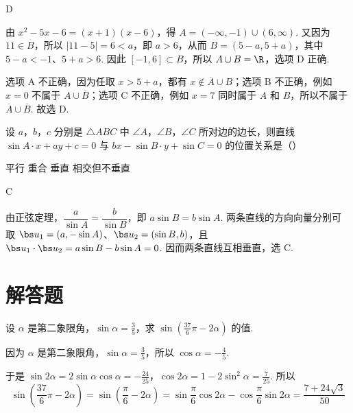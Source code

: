 \documentclass[UTF8,a4paper,oneside,11pt]{ctexbook}
\begin{document}
\begin{answer}
D
\end{answer}

\begin{solution}
由 \(x^2-5x-6=(x+1)(x-6)\)，得 \(A=(-\infty,-1)\cup(6,\infty)\). 又因为 \(11\in B\)，所以 \(|11-5|=6<a\)，即 \(a>6\)，从而 \(B=(5-a,5+a)\)，其中 \(5-a<-1\)、\(5+a>6\). 因此 \([-1,6]\subset B\)，所以 \(A\cup B=\R\)，选项 D 正确.

选项 A 不正确，因为任取 \(x>5+a\)，都有 \(x\notin\overline A\cup B\)；选项 B 不正确，例如 \(x=0\) 不属于 \(A\cup\overline B\)；选项 C 不正确，例如 \(x=7\) 同时属于 \(A\) 和 \(B\)，所以不属于 \(\overline A\cup\overline B\). 故选 D.
\end{solution}

\begin{problem}
设 \(a\)，\(b\)，\(c\) 分别是 \(\triangle ABC\) 中 \(\angle A\)，\(\angle B\)，\(\angle C\) 所对边的边长，则直线 \(\sin A \cdot x + ay + c = 0\) 与 \(bx - \sin B \cdot y + \sin C = 0\) 的位置关系是（\quad）

\choices
    {平行}
    {重合}
    {垂直}
    {相交但不垂直}
\end{problem}

\begin{answer}
C
\end{answer}

\begin{solution}
由正弦定理，\(\dfrac{a}{\sin A}=\dfrac{b}{\sin B}\)，即 \(a\sin B=b\sin A\). 两条直线的方向向量分别可取 \(\bs u_1=(a,-\sin A)\)、\(\bs u_2=(\sin B,b)\)，且 \(\bs u_1\cdot\bs u_2=a\sin B-b\sin A=0\). 因而两条直线互相垂直，选 C.
\end{solution}

\section{解答题}

\begin{problem}
设 \(\alpha\) 是第二象限角，\(\sin \alpha = \frac{3}{5}\)，求 \(\sin \left(\frac{37}{6} \pi - 2\alpha\right)\) 的值.
\end{problem}

\begin{solution}
因为 \(\alpha\) 是第二象限角，\(\sin\alpha=\frac{3}{5}\)，所以 \(\cos\alpha=-\frac{4}{5}\).

于是 \(\sin2\alpha=2\sin\alpha\cos\alpha=-\frac{24}{25}\)，\(\cos2\alpha=1-2\sin^2\alpha=\frac{7}{25}\).
所以
\[
\sin\left(\frac{37}{6}\pi-2\alpha\right)
=\sin\left(\frac{\pi}{6}-2\alpha\right)
=\sin\frac{\pi}{6}\cos2\alpha-\cos\frac{\pi}{6}\sin2\alpha
=\frac{7+24\sqrt{3}}{50}
\]
\end{solution}
\end{document}
